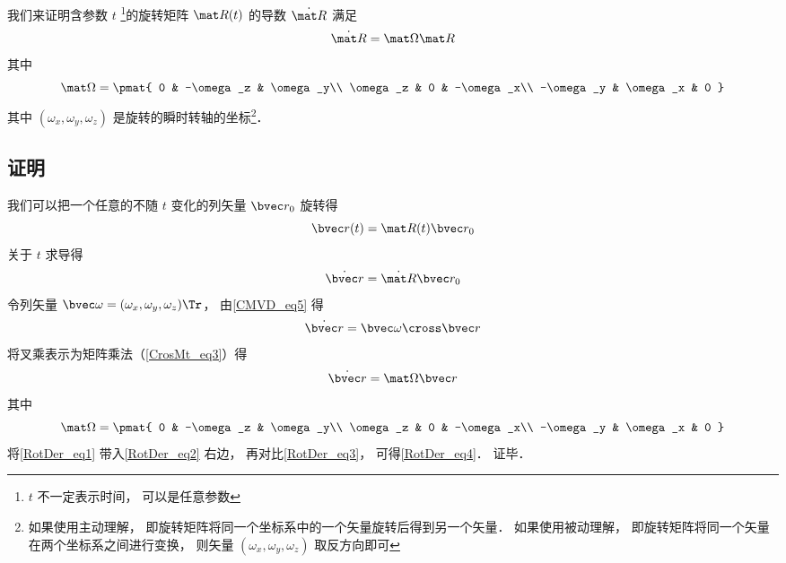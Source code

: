

我们来证明含参数 $t$ \footnote{$t$ 不一定表示时间， 可以是任意参数}的旋转矩阵 $\mat R(t)$ 的导数 $\dot{\mat R}$ 满足
\begin{equation}\label{RotDer_eq4}
\dot{\mat R} = \mat \Omega \mat R
\end{equation}
其中
\begin{equation}
\mat \Omega = \pmat{
0 & -\omega_z & \omega_y\\
\omega_z & 0 & -\omega_x\\
-\omega_y & \omega_x & 0
}
\end{equation}
其中 $(\omega_x, \omega_y, \omega_z)$ 是旋转的瞬时转轴的坐标\footnote{如果使用主动理解， 即旋转矩阵将同一个坐标系中的一个矢量旋转后得到另一个矢量． 如果使用被动理解， 即旋转矩阵将同一个矢量在两个坐标系之间进行变换， 则矢量 $(\omega_x, \omega_y, \omega_z)$ 取反方向即可}．%

\subsection{证明}
我们可以把一个任意的不随 $t$ 变化的列矢量 $\bvec r_0$ 旋转得
\begin{equation}\label{RotDer_eq1}
\bvec r(t) = \mat R(t) \bvec r_0
\end{equation}
关于 $t$ 求导得
\begin{equation}\label{RotDer_eq3}
\dot{\bvec r} = \dot{\mat R} \bvec r_0
\end{equation}
令列矢量 $\bvec \omega = (\omega_x, \omega_y, \omega_z)\Tr$， 由\autoref{CMVD_eq5} 得
\begin{equation}
\dot{\bvec r} = \bvec\omega \cross \bvec r
\end{equation}
将叉乘表示为矩阵乘法（\autoref{CrosMt_eq3}）得
\begin{equation}\label{RotDer_eq2}
\dot{\bvec r} = \mat\Omega \bvec r
\end{equation}
其中
\begin{equation}
\mat \Omega = \pmat{
0 & -\omega_z & \omega_y\\
\omega_z & 0 & -\omega_x\\
-\omega_y & \omega_x & 0
}\end{equation}
将\autoref{RotDer_eq1} 带入\autoref{RotDer_eq2} 右边， 再对比\autoref{RotDer_eq3}， 可得\autoref{RotDer_eq4}． 证毕．

